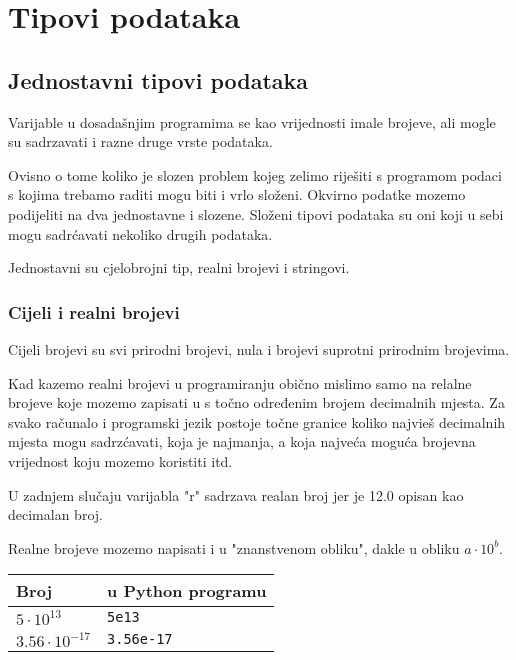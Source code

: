 \chapter{Tipovi podataka}

\section{Jednostavni tipovi podataka}

	Varijable u dosadašnjim programima se kao vrijednosti imale brojeve, ali
	mogle su sadrzavati i razne druge vrste podataka.

	Ovisno o tome koliko je slozen problem kojeg zelimo riješiti s
	programom podaci s kojima trebamo raditi mogu biti i vrlo složeni. Okvirno
	podatke mozemo podijeliti na dva jednostavne i slozene. Složeni tipovi
	podataka su oni koji u sebi mogu sadrćavati nekoliko drugih podataka.

	Jednostavni su cjelobrojni tip, realni brojevi i stringovi.

\subsection{Cijeli i realni brojevi}

	Cijeli brojevi su svi prirodni brojevi, nula i brojevi suprotni prirodnim
	brojevima.

	Kad kazemo realni brojevi u programiranju obično mislimo samo na relalne
	brojeve koje mozemo zapisati u s točno određenim brojem decimalnih
	mjesta. Za svako računalo i programski jezik postoje točne granice koliko
	najvieš decimalnih mjesta mogu sadrzćavati, koja je najmanja, a koja
	najveća moguća brojevna vrijednost koju mozemo koristiti itd.


	U zadnjem slučaju varijabla "r" sadrzava realan broj jer je 12.0
	opisan kao decimalan broj. 

	Realne brojeve mozemo napisati i u "znanstvenom obliku", dakle u obliku $a\cdot
	10^{b}$.

	\vspace{3mm}
	\begin{tabular}{l|l}
		Broj & u Python programu\\
		\hline
		$5\cdot 10^{13}$ & \verb+5e13+\\
		$3.56\cdot 10^{-17}$ & \verb+3.56e-17+\\
	\end{tabular}
	\vspace{3mm}

